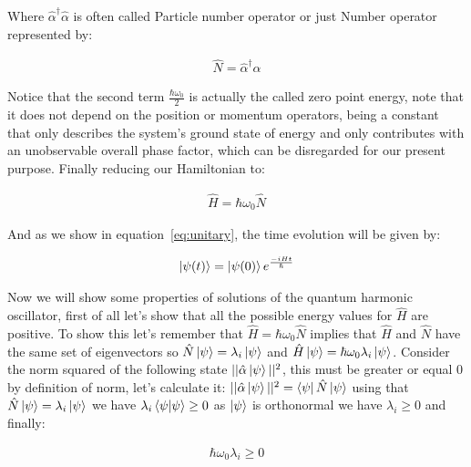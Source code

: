 \documentclass[
  journal=largetwo,
  year=2023,
]{cup-journal}
\begin{document}
Where \(\hat{\alpha}^{\dag}\hat{\alpha}\) is often called Particle number operator or just Number operator represented by:

\begin{equation}
  \begin{aligned}\label{eq:10}
    \hat{N} = \hat{\alpha}^{\dag}\hat{\alpha}
  \end{aligned}
\end{equation}


Notice that the second term \(\frac{\hbar\omega_0}{2}\) is actually the called zero point energy, note that it does not depend on the position or momentum operators, being a constant that only describes the system's ground state of energy and only contributes with an unobservable overall phase factor, which can be disregarded for our present purpose. Finally reducing our Hamiltonian to:

\begin{equation}
  \begin{aligned}\label{eq:11}
    \hat{H} = \hbar\omega_0\hat{N}
  \end{aligned}
\end{equation}


And as we show in equation~\ref{eq:unitary}, the time evolution will be given by:

\begin{equation}
  \begin{aligned}\label{eq:12}
    \ket{\psi(t)} = \ket{\psi(0)}e^{\frac{-iHt}{\hbar}}
  \end{aligned}
\end{equation}


Now we will show some properties of solutions of the quantum harmonic oscillator, first of all let's show that all the possible energy values for \(\hat{H}\) are positive. To show this let's remember that \(\hat{H} = \hbar\omega_0\hat{N}\) implies that \(\hat{H}\) and \(\hat{N}\) have the same set of eigenvectors so \(\hat{N}\ket{\psi} = \lambda_i\ket{\psi}\) and \(\hat{H}\ket{\psi} = \hbar\omega_0\lambda_i\ket{\psi}\). Consider the norm squared of the following state \(||\hat{\alpha}\ket{\psi}||^2\), this must be greater or equal 0 by definition of norm, let's calculate it: \(||\hat{\alpha}\ket{\psi}||^2 = \bra{\psi}\hat{N}\ket{\psi}\) using that \(\hat{N}\ket{\psi} = \lambda_i\ket{\psi}\) we have \(\lambda_i\bra{\psi}\ket{\psi} \geq 0\) as \(\ket{\psi}\) is orthonormal we have \(\lambda_i \geq 0\) and finally:

\begin{equation}
  \begin{aligned}\label{eq:13}
    \hbar\omega_0\lambda_i \geq 0
  \end{aligned}
\end{equation}
\end{document}
